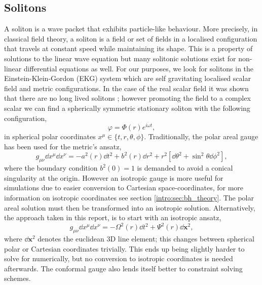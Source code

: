 \subsection{Solitons} \label{boson:sec:soliton}
A soliton is a wave packet that exhibits particle-like behaviour. More precisely, in classical field theory, a soliton
is a field or set of fields in a localised configuration that travels at constant speed while maintaining its shape. This is a property of solutions to the linear wave equation but many solitonic solutions exist for non-linear differential equations as well. For
our purposes, we look for solitons in the Einstein-Klein-Gordon (EKG) system which are self gravitating
localised scalar field and metric configurations. In the case of the real scalar field it was shown that
there are no long lived solitons \cite{diez2013no}; however promoting the field to a complex scalar we can find a spherically
symmetric stationary soliton with the following configuration,
\begin{equation} \varphi = \Phi(r)e^{i\omega t}, \label{boson:eq:fieldansatz} \end{equation}
in spherical polar coordinates $x^\mu \in \{t,r,\theta,\phi \}$.
Traditionally, the polar areal gauge has been used for the metric's ansatz,
\begin{equation}g_{\mu\nu}\dd x^\mu \dd x^\nu =- a^2(r)\dd t^2 + b^2(r) \dd r^2 + r^2 \left[ \dd \theta^2 + \sin^2\theta \dd \phi^2\right],\label{boson:eq:polaransatz}\end{equation}
where the boundary condition $b^2(0)=1$ is demanded to avoid a conical singularity at the origin. However an isotropic gauge is more useful for simulations due to easier conversion to Cartesian space-coordinates, for more information on isotropic coordinates see section \ref{intro:sec:bh_theory}. The polar areal solution must then be transformed into an isotropic solution. Alternatively, the approach taken in this report, is to start with an isotropic ansatz,
\begin{equation} g_{\mu\nu}\dd x^\mu \dd x^\nu =- \Omega^2(r)\dd t^2 + \Psi^2(r)\dd \bm{x}^2,\label{boson:eq:metricansatz}\end{equation}
where $\dd \bm{x}^2$ denotes the euclidean 3D line element; this changes between spherical polar or Cartesian coordinates trivially. This ends up being slightly harder to solve for numerically, but no conversion to isotropic coordinates is needed afterwards. The conformal gauge also lends itself better to constraint solving schemes.

